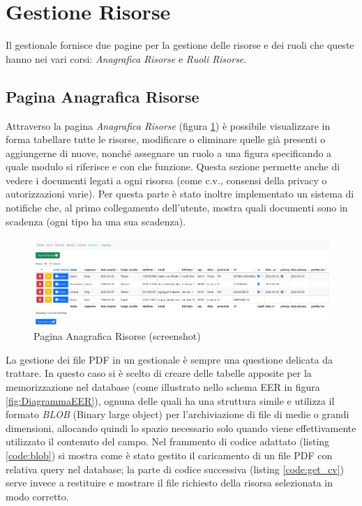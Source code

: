 \section{Gestione Risorse}
Il gestionale fornisce due pagine per la gestione delle risorse e dei ruoli che queste hanno nei vari corsi: \textit{Anagrafica Risorse} e \textit{Ruoli Risorse}.
\subsection{Pagina Anagrafica Risorse}
Attraverso la pagina \textit{Anagrafica Risorse} (figura \ref{fig:risorse}) è possibile visualizzare in forma tabellare tutte le risorse, modificare o eliminare quelle già presenti o aggiungerne di nuove, nonché assegnare un ruolo a una figura specificando a quale modulo si riferisce e con che funzione. Questa sezione permette anche di vedere i documenti legati a ogni risorsa (come c.v., consensi della privacy o autorizzazioni varie). Per questa parte è stato inoltre implementato un sistema di notifiche che, al primo collegamento dell'utente, mostra quali documenti sono in scadenza (ogni tipo ha una sua scadenza).
\begin{figure}[!hbt]
\centering
\includegraphics[scale=0.55]{img/screen/Risorse-1.jpg}
\caption{Pagina Anagrafica Risorse (screenshot)}
\label{fig:risorse}
\end{figure}
\newline
\newline
La gestione dei file PDF in un gestionale è sempre una questione delicata da trattare. In questo caso si è scelto di creare delle tabelle apposite per la memorizzazione nel database (come illustrato nello schema EER in figura \ref{fig:DiagrammaEER}), ognuna delle quali ha una struttura simile e utilizza il formato \textit{BLOB} (Binary large object) \cite{blob} per l'archiviazione di file di medie o grandi dimensioni, allocando quindi lo spazio necessario solo quando viene effettivamente utilizzato il contenuto del campo.\newline
Nel frammento di codice adattato (listing  \ref{code:blob}) si mostra come è stato gestito il caricamento di un file PDF con relativa query nel database; la parte di codice successiva (listing \ref{code:get_cv}) serve invece a restituire e mostrare il file richiesto della risorsa selezionata in modo corretto.
